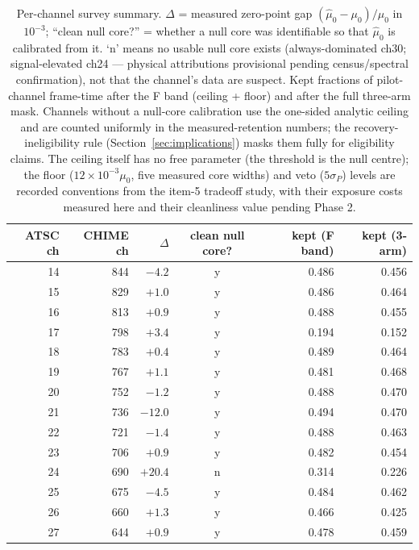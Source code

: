\begin{table}
  \centering
  \caption{Per-channel survey summary. $\Delta$ = measured zero-point gap
  $(\hat\mu_0-\mu_0)/\mu_0$ in $10^{-3}$; ``clean null core?'' = whether
  a null core was identifiable so that $\hat\mu_0$ is calibrated from it.
  `n' means no usable null core exists (always-dominated ch30;
  signal-elevated ch24 --- physical attributions provisional pending
  census/spectral confirmation), not that the channel's data are suspect.
  Kept fractions of pilot-channel frame-time after the F band (ceiling +
  floor) and after the full three-arm mask. Channels without a null-core
  calibration use the one-sided analytic ceiling and are counted
  uniformly in the measured-retention numbers; the recovery-ineligibility
  rule (Section~\ref{sec:implications}) masks them fully for
  eligibility claims. The ceiling itself has no
  free parameter (the threshold is the null centre); the floor
  ($12\times10^{-3}\mu_0$, five measured core widths) and veto
  ($5\sigma_P$) levels are recorded conventions from the item-5
  tradeoff study, with their exposure costs measured here and their
  cleanliness value pending Phase 2.}
  \label{tab:perchannel}
  \begin{tabular}{rrrcrr}
    \toprule
    ATSC ch & CHIME ch & $\Delta$ & clean null core? & kept (F band) & kept (3-arm) \\
    \midrule
    14 & 844 & $-4.2$ & y & 0.486 & 0.456 \\
    15 & 829 & $+1.0$ & y & 0.486 & 0.464 \\
    16 & 813 & $+0.9$ & y & 0.488 & 0.455 \\
    17 & 798 & $+3.4$ & y & 0.194 & 0.152 \\
    18 & 783 & $+0.4$ & y & 0.489 & 0.464 \\
    19 & 767 & $+1.1$ & y & 0.481 & 0.468 \\
    20 & 752 & $-1.2$ & y & 0.488 & 0.470 \\
    21 & 736 & $-12.0$ & y & 0.494 & 0.470 \\
    22 & 721 & $-1.4$ & y & 0.488 & 0.463 \\
    23 & 706 & $+0.9$ & y & 0.482 & 0.454 \\
    24 & 690 & $+20.4$ & n & 0.314 & 0.226 \\
    25 & 675 & $-4.5$ & y & 0.484 & 0.462 \\
    26 & 660 & $+1.3$ & y & 0.466 & 0.425 \\
    27 & 644 & $+0.9$ & y & 0.478 & 0.459 \\

\end{tabular}
\end{table}
